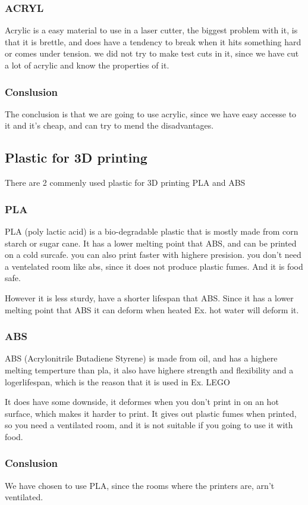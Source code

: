 \subsubsection{ACRYL}
Acrylic is a easy material to use in a laser cutter, the biggest problem with it, is that it is brettle, and does have a tendency to break when it hits something hard or comes under tension.
we did not try to make test cuts in it, since we have cut a lot of acrylic and know the properties of it.


\subsubsection{Conslusion}
The conclusion is that we are going to use acrylic, since we have easy accesse to it and it's cheap, and can try to mend the disadvantages.

\subsection{Plastic for 3D printing}
There are 2 commenly used plastic for 3D printing PLA and ABS \cite{PLAABS}

\subsubsection{PLA}
PLA (poly lactic acid) is a bio-degradable plastic that is mostly made from corn starch or sugar cane.
It has a lower melting point that ABS, and can be printed on a cold surcafe. you can also print faster with highere presision. you don't need a ventelated room like abs, since it does not produce plastic fumes. And it is food safe.

However it is less sturdy, have a shorter lifespan that ABS. Since it has a lower melting point that ABS it can deform when heated Ex. hot water will deform it.

\subsubsection{ABS}
ABS (Acrylonitrile Butadiene Styrene) is made from oil, and has a highere melting temperture than pla, it also have highere strength and flexibility and a logerlifespan, which is the reason that it is used in Ex. LEGO

It does have some downside, it deformes when you don't print in on an hot surface, which makes it harder to print. It gives out plastic fumes when printed, so you need a ventilated room, and it is not suitable if you going to use it with food.

\subsubsection{Conslusion}
We have chosen to use PLA, since the rooms where the printers are, arn't ventilated.

